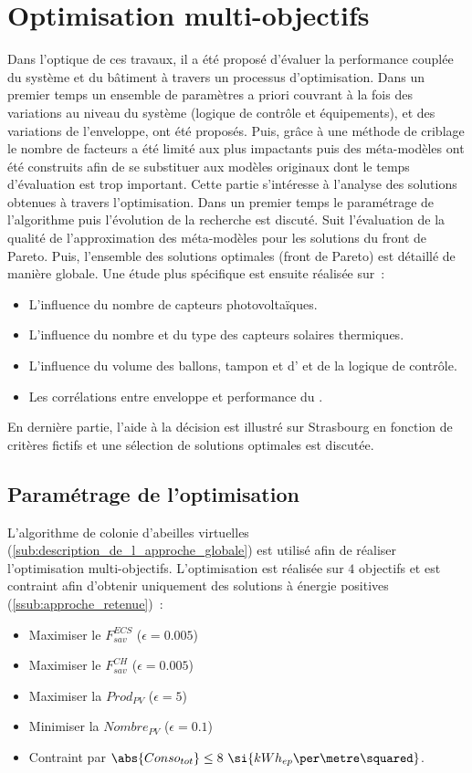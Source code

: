 \section{Optimisation multi-objectifs} %
\label{sec:optimisation_multi_objectif}
Dans l’optique de ces travaux, il a été proposé d’évaluer la performance couplée
du système et du bâtiment à travers un processus d’optimisation. Dans un premier temps
un ensemble de paramètres a priori couvrant à la fois des variations
au niveau du système (logique de contrôle et équipements), et des variations de l’enveloppe,
ont été proposés. Puis, grâce à une méthode de criblage le nombre de facteurs a été limité
aux plus impactants puis des méta-modèles ont été construits afin de se substituer
aux modèles originaux dont le temps d’évaluation est trop important.
Cette partie s’intéresse à l’analyse des solutions obtenues à travers l’optimisation.
Dans un premier temps le paramétrage de l’algorithme puis l’évolution de la recherche est discuté.
Suit l’évaluation de la qualité de l’approximation des méta-modèles pour les solutions
du front de Pareto.
Puis, l’ensemble des solutions optimales (front de Pareto) est détaillé de manière globale. Une étude
plus spécifique est ensuite réalisée sur~:
\begin{itemize}
  \item L’influence du nombre de capteurs photovoltaïques.
  \item L’influence du nombre et du type des capteurs solaires thermiques.
  \item L’influence du volume des ballons, tampon et d’ et de la logique de contrôle.
  \item Les corrélations entre enveloppe et performance du .
\end{itemize}
En dernière partie, l’aide à la décision est illustré sur Strasbourg en fonction
de critères fictifs et une sélection de solutions optimales est discutée.



\subsection{Paramétrage de l’optimisation} %
\label{sub:parametrage_de_l_optimisation}
L’algorithme de colonie d’abeilles virtuelles (\ref{sub:description_de_l_approche_globale})
est utilisé afin de réaliser l’optimisation multi-objectifs. L’optimisation est réalisée
sur $4$ objectifs et est contraint afin d’obtenir uniquement des solutions à énergie
positives (\ref{ssub:approche_retenue})~:
\begin{itemize}
  \item Maximiser le $F_{sav}^{ECS}$ ($\epsilon = 0.005$)
  \item Maximiser le $F_{sav}^{CH}$ ($\epsilon = 0.005$)
  \item Maximiser la $Prod_{PV}$ ($\epsilon = 5$)
  \item Minimiser la $Nombre_{PV}$ ($\epsilon = 0.1$)
  \item Contraint par $\abs{Conso_{tot}}   \leq  8 \ \si{kWh_{ep}\per\metre\squared}$.
\end{itemize}

